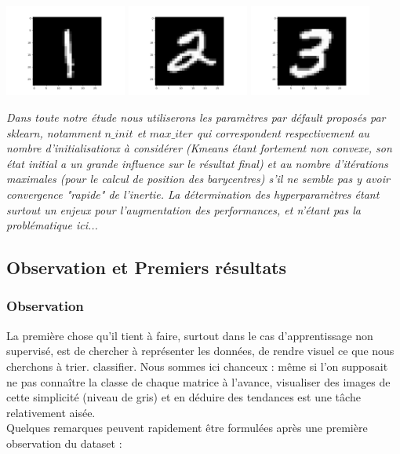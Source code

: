 \documentclass{article}
\begin{document}
\begin{center}
  \includegraphics[width=0.3\textwidth]{"./Images/1.png"}
  \includegraphics[width=0.3\textwidth]{"./Images/2.png"}
  \includegraphics[width=0.3\textwidth]{"./Images/3.png"}
\end{center}



\textit{Dans toute notre étude nous utiliserons les paramètres par défault proposés par sklearn,  notamment $n\_init$ et $max\_iter$ qui correspondent respectivement au nombre d'initialisationx à considérer (Kmeans étant fortement non convexe, son état initial a un grande influence sur le résultat final) et au nombre d'itérations maximales (pour le calcul de position des barycentres) s'il ne semble pas y avoir convergence "rapide" de l'inertie. \newline La détermination des hyperparamètres étant surtout un enjeux pour l'augmentation des performances, et n'étant pas la problématique ici...}

\subsection{Observation et Premiers résultats}

\subsubsection{Observation}

La première chose qu'il tient à faire, surtout dans le cas d'apprentissage non supervisé, est de chercher à représenter les données, de rendre visuel ce que nous cherchons à trier. classifier. Nous sommes ici chanceux : même si l'on supposait ne pas connaître la classe de chaque matrice à l'avance, visualiser des images de cette simplicité (niveau de gris) et en déduire des tendances est une tâche relativement aisée. \\
Quelques remarques peuvent rapidement être formulées après une première observation du dataset : 
\end{document}
